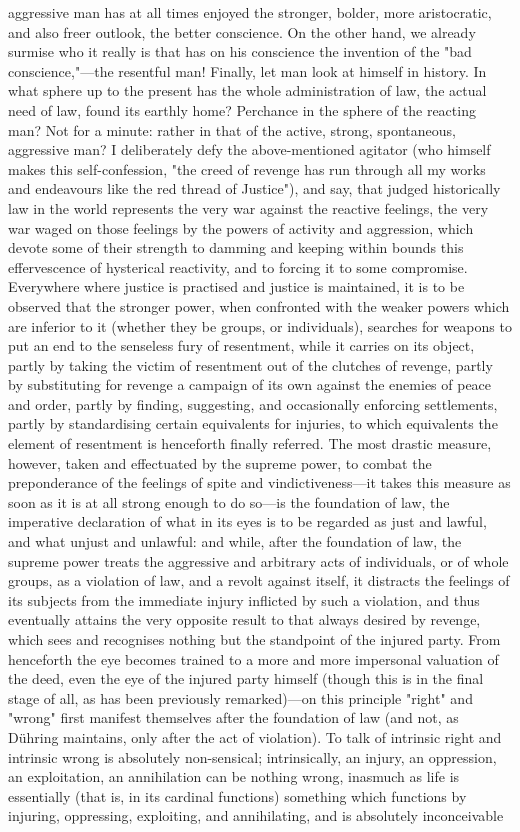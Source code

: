 \documentclass[12pt]{article}
\begin{document}
aggressive man has at all times enjoyed the stronger, bolder, more aristocratic, and also freer outlook, the better conscience. On the other hand, we already surmise who it really is that has on his conscience the invention of the "bad conscience,"---the resentful man! Finally, let man look at himself in history. In what sphere up to the present has the whole administration of law, the actual need of law, found its earthly home? Perchance in the sphere of the reacting man? Not for a minute: rather in that of the active, strong, spontaneous, aggressive man? I deliberately defy the above-mentioned agitator (who himself makes this self-confession, "the creed of revenge has run through all my works and endeavours like the red thread of Justice"), and say, that judged historically law in the world represents the very war against the reactive feelings, the very war waged on those feelings by the powers of activity and aggression, which devote some of their strength to damming and keeping within bounds this effervescence of hysterical reactivity, and to forcing it to some compromise. Everywhere where justice is practised and justice is maintained, it is to be observed that the stronger power, when confronted with the weaker powers which are inferior to it (whether they be groups, or individuals), searches for weapons to put an end to the senseless fury of resentment, while it carries on its object, partly by taking the victim of resentment out of the clutches of revenge, partly by substituting for revenge a campaign of its own against the enemies of peace and order, partly by finding, suggesting, and occasionally enforcing settlements, partly by standardising certain equivalents for injuries, to which equivalents the element of resentment is henceforth finally referred. The most drastic measure, however, taken and effectuated by the supreme power, to combat the preponderance of the feelings of spite and vindictiveness---it takes this measure as soon as it is at all strong enough to do so---is the foundation of law, the imperative declaration of what in its eyes is to be regarded as just and lawful, and what unjust and unlawful: and while, after the foundation of law, the supreme power treats the aggressive and arbitrary acts of individuals, or of whole groups, as a violation of law, and a revolt against itself, it distracts the feelings of its subjects from the immediate injury inflicted by such a violation, and thus eventually attains the very opposite result to that always desired by revenge, which sees and recognises nothing but the standpoint of the injured party. From henceforth the eye becomes trained to a more and more impersonal valuation of the deed, even the eye of the injured party himself (though this is in the final stage of all, as has been previously remarked)---on this principle "right" and "wrong" first manifest themselves after the foundation of law (and not, as Dühring maintains, only after the act of violation). To talk of intrinsic right and intrinsic wrong is absolutely non-sensical; intrinsically, an injury, an oppression, an exploitation, an annihilation can be nothing wrong, inasmuch as life is essentially (that is, in its cardinal functions) something which functions by injuring, oppressing, exploiting, and annihilating, and is absolutely inconceivable 
\end{document}
